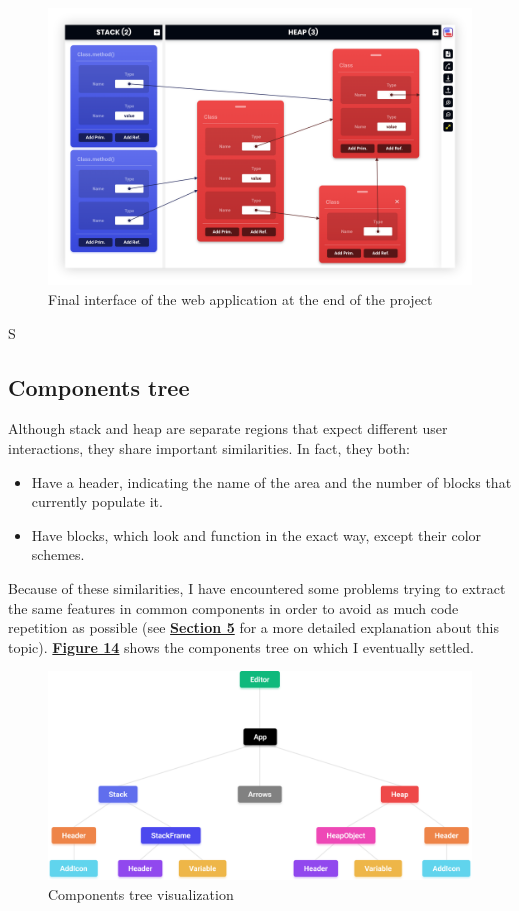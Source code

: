 \documentclass[]{usiinfbachelorproject}
\begin{document}
\begin{figure}[h!]
\centering
\includegraphics[width=\textwidth]{figures/final-interface.png}
\caption {Final interface of the web application at the end of the project}
\end{figure}
S\subsection{Components tree}

Although stack and heap are separate regions that expect different user interactions, they share important similarities. In fact, they both:

\begin{itemize}
	\item Have a header, indicating the name of the area and the number of blocks that currently populate it.
	\item Have blocks, which look and function in the exact way, except their color schemes.
\end{itemize}

\noindent Because of these similarities, I have encountered some problems trying to extract the same features in common components in order to avoid as much code repetition as possible (see \hyperref[implementation]{\textbf{Section 5}} for a more detailed explanation about this topic). \hyperref[tree]{\textbf{Figure 14}} shows the components tree on which I eventually settled.

\bigskip

\begin{figure}[h!]
\centering
\includegraphics[width=\textwidth]{figures/tree.png}
\caption {Components tree visualization}
\label{tree}
\end{figure}
\end{document}
